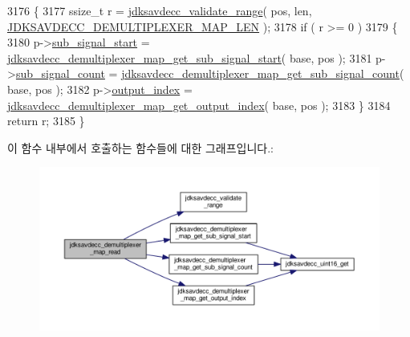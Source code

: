 \begin{DoxyCode}
3176 \{
3177     ssize\_t r = \hyperlink{group__util_ga9c02bdfe76c69163647c3196db7a73a1}{jdksavdecc\_validate\_range}( pos, len, 
      \hyperlink{group__demultiplexer__map_ga8b3c020525226264283bd200ab36296e}{JDKSAVDECC\_DEMULTIPLEXER\_MAP\_LEN} );
3178     \textcolor{keywordflow}{if} ( r >= 0 )
3179     \{
3180         p->\hyperlink{structjdksavdecc__demultiplexer__map_a4277ab8f00d35ea7381d919a79324a2f}{sub\_signal\_start} = 
      \hyperlink{group__demultiplexer__map_gaeac54a26ea375cbe0d5b2b8a123bb6a1}{jdksavdecc\_demultiplexer\_map\_get\_sub\_signal\_start}( base, 
      pos );
3181         p->\hyperlink{structjdksavdecc__demultiplexer__map_a539ba5ac909f01c2b76e345233d20902}{sub\_signal\_count} = 
      \hyperlink{group__demultiplexer__map_gaaf0bb4a7ccfc5d5a2ae4cac02e854d8d}{jdksavdecc\_demultiplexer\_map\_get\_sub\_signal\_count}( base, 
      pos );
3182         p->\hyperlink{structjdksavdecc__demultiplexer__map_a894cb1dd2c8dab6ee5d8e165370fa0a7}{output\_index} = 
      \hyperlink{group__demultiplexer__map_ga5a25655bd8dedb611c9be23190fee7ff}{jdksavdecc\_demultiplexer\_map\_get\_output\_index}( base, pos );
3183     \}
3184     \textcolor{keywordflow}{return} r;
3185 \}
\end{DoxyCode}


이 함수 내부에서 호출하는 함수들에 대한 그래프입니다.\+:
\nopagebreak
\begin{figure}[H]
\begin{center}
\leavevmode
\includegraphics[width=350pt]{group__demultiplexer__map_ga6f5a30b4c818f66d9279171a54ec2307_cgraph}
\end{center}
\end{figure}


